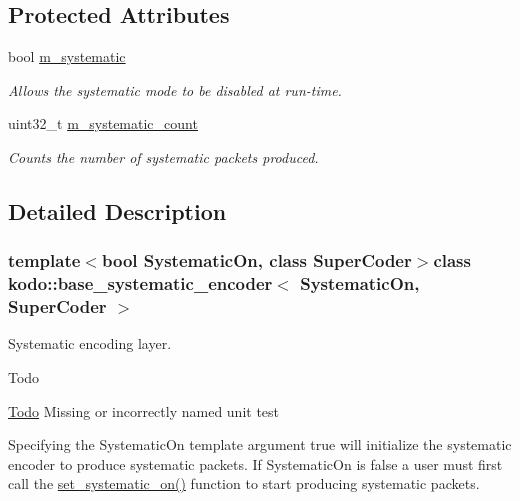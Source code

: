 \subsection*{Protected Attributes}
\begin{DoxyCompactItemize}
\item 
\hypertarget{classkodo_1_1base__systematic__encoder_a6cefdfa9ddbbf04a8befd209c15414eb}{bool \hyperlink{classkodo_1_1base__systematic__encoder_a6cefdfa9ddbbf04a8befd209c15414eb}{m\-\_\-systematic}}\label{classkodo_1_1base__systematic__encoder_a6cefdfa9ddbbf04a8befd209c15414eb}

\begin{DoxyCompactList}\small\item\em Allows the systematic mode to be disabled at run-\/time. \end{DoxyCompactList}\item 
\hypertarget{classkodo_1_1base__systematic__encoder_aea7feb3a62d1fddb3d7fce9f80806c2c}{uint32\-\_\-t \hyperlink{classkodo_1_1base__systematic__encoder_aea7feb3a62d1fddb3d7fce9f80806c2c}{m\-\_\-systematic\-\_\-count}}\label{classkodo_1_1base__systematic__encoder_aea7feb3a62d1fddb3d7fce9f80806c2c}

\begin{DoxyCompactList}\small\item\em Counts the number of systematic packets produced. \end{DoxyCompactList}\end{DoxyCompactItemize}


\subsection{Detailed Description}
\subsubsection*{template$<$bool Systematic\-On, class Super\-Coder$>$class kodo\-::base\-\_\-systematic\-\_\-encoder$<$ Systematic\-On, Super\-Coder $>$}

Systematic encoding layer. 

\begin{DoxyRefDesc}{Todo}
\item[\hyperlink{todo__todo000066}{Todo}]Missing or incorrectly named unit test\end{DoxyRefDesc}
Specifying the Systematic\-On template argument true will initialize the systematic encoder to produce systematic packets. If Systematic\-On is false a user must first call the \hyperlink{classkodo_1_1base__systematic__encoder_a4b09755cebbd9c02c52d1cad84ab0b6f}{set\-\_\-systematic\-\_\-on()} function to start producing systematic packets. 

